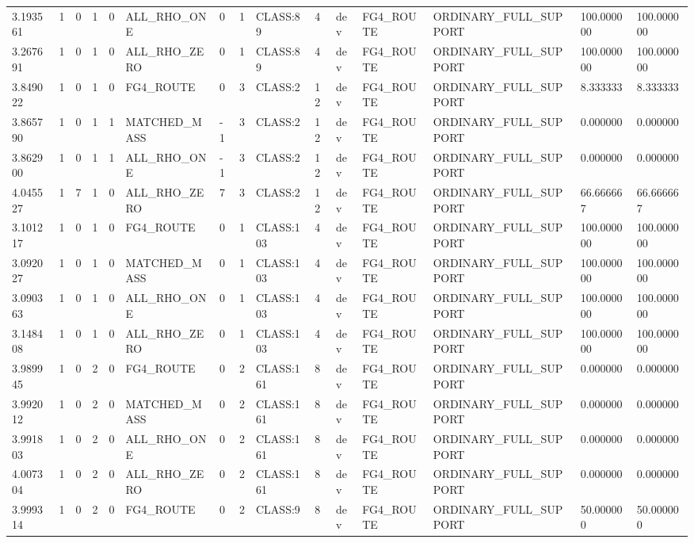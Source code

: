 \begin{tabular}{lllllllllllllll}
3.193561 & 1 & 0 & 1 & 0 & ALL\_RHO\_ONE & 0 & 1 & CLASS:89 & 4 & dev & FG4\_ROUTE & ORDINARY\_FULL\_SUPPORT & 100.000000 & 100.000000 \\
3.267691 & 1 & 0 & 1 & 0 & ALL\_RHO\_ZERO & 0 & 1 & CLASS:89 & 4 & dev & FG4\_ROUTE & ORDINARY\_FULL\_SUPPORT & 100.000000 & 100.000000 \\
3.849022 & 1 & 0 & 1 & 0 & FG4\_ROUTE & 0 & 3 & CLASS:2 & 12 & dev & FG4\_ROUTE & ORDINARY\_FULL\_SUPPORT & 8.333333 & 8.333333 \\
3.865790 & 1 & 0 & 1 & 1 & MATCHED\_MASS & -1 & 3 & CLASS:2 & 12 & dev & FG4\_ROUTE & ORDINARY\_FULL\_SUPPORT & 0.000000 & 0.000000 \\
3.862900 & 1 & 0 & 1 & 1 & ALL\_RHO\_ONE & -1 & 3 & CLASS:2 & 12 & dev & FG4\_ROUTE & ORDINARY\_FULL\_SUPPORT & 0.000000 & 0.000000 \\
4.045527 & 1 & 7 & 1 & 0 & ALL\_RHO\_ZERO & 7 & 3 & CLASS:2 & 12 & dev & FG4\_ROUTE & ORDINARY\_FULL\_SUPPORT & 66.666667 & 66.666667 \\
3.101217 & 1 & 0 & 1 & 0 & FG4\_ROUTE & 0 & 1 & CLASS:103 & 4 & dev & FG4\_ROUTE & ORDINARY\_FULL\_SUPPORT & 100.000000 & 100.000000 \\
3.092027 & 1 & 0 & 1 & 0 & MATCHED\_MASS & 0 & 1 & CLASS:103 & 4 & dev & FG4\_ROUTE & ORDINARY\_FULL\_SUPPORT & 100.000000 & 100.000000 \\
3.090363 & 1 & 0 & 1 & 0 & ALL\_RHO\_ONE & 0 & 1 & CLASS:103 & 4 & dev & FG4\_ROUTE & ORDINARY\_FULL\_SUPPORT & 100.000000 & 100.000000 \\
3.148408 & 1 & 0 & 1 & 0 & ALL\_RHO\_ZERO & 0 & 1 & CLASS:103 & 4 & dev & FG4\_ROUTE & ORDINARY\_FULL\_SUPPORT & 100.000000 & 100.000000 \\
3.989945 & 1 & 0 & 2 & 0 & FG4\_ROUTE & 0 & 2 & CLASS:161 & 8 & dev & FG4\_ROUTE & ORDINARY\_FULL\_SUPPORT & 0.000000 & 0.000000 \\
3.992012 & 1 & 0 & 2 & 0 & MATCHED\_MASS & 0 & 2 & CLASS:161 & 8 & dev & FG4\_ROUTE & ORDINARY\_FULL\_SUPPORT & 0.000000 & 0.000000 \\
3.991803 & 1 & 0 & 2 & 0 & ALL\_RHO\_ONE & 0 & 2 & CLASS:161 & 8 & dev & FG4\_ROUTE & ORDINARY\_FULL\_SUPPORT & 0.000000 & 0.000000 \\
4.007304 & 1 & 0 & 2 & 0 & ALL\_RHO\_ZERO & 0 & 2 & CLASS:161 & 8 & dev & FG4\_ROUTE & ORDINARY\_FULL\_SUPPORT & 0.000000 & 0.000000 \\
3.999314 & 1 & 0 & 2 & 0 & FG4\_ROUTE & 0 & 2 & CLASS:9 & 8 & dev & FG4\_ROUTE & ORDINARY\_FULL\_SUPPORT & 50.000000 & 50.000000 \\

\end{tabular}
